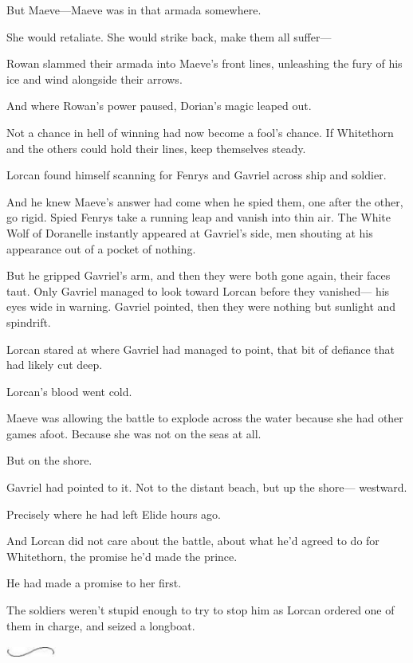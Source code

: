 But Maeve---Maeve was in that armada somewhere.

She would retaliate. She would strike back, make them all suffer---

Rowan slammed their armada into Maeve's front lines, unleashing the fury of his ice and wind alongside their arrows.

And where Rowan's power paused, Dorian's magic leaped out.

Not a chance in hell of winning had now become a fool's chance. If Whitethorn and the others could hold their lines, keep themselves steady.

Lorcan found himself scanning for Fenrys and Gavriel across ship and soldier.

And he knew Maeve's answer had come when he spied them, one after the other, go rigid. Spied Fenrys take a running leap and vanish into thin air. The White Wolf of Doranelle instantly appeared at Gavriel's side, men shouting at his appearance out of a pocket of nothing.

But he gripped Gavriel's arm, and then they were both gone again, their faces taut. Only Gavriel managed to look toward Lorcan before they vanished--- his eyes wide in warning. Gavriel pointed, then they were nothing but sunlight and spindrift.

Lorcan stared at where Gavriel had managed to point, that bit of defiance that had likely cut deep.

Lorcan's blood went cold.

Maeve was allowing the battle to explode across the water because she had other games afoot. Because she was not on the seas at all.

But on the shore.

Gavriel had pointed to it. Not to the distant beach, but up the shore--- westward.

Precisely where he had left Elide hours ago.

And Lorcan did not care about the battle, about what he'd agreed to do for Whitethorn, the promise he'd made the prince.

He had made a promise to her first.

The soldiers weren't stupid enough to try to stop him as Lorcan ordered one of them in charge, and seized a longboat.

\includegraphics[width=0.65in,height=0.13in]{images/seperator}

